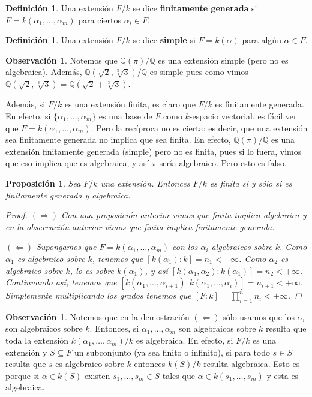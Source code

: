 \documentclass[12pt]{book}
\newtheorem{prop}[teo]{Proposición}
\theoremstyle{definition}
\newtheorem{obs}[teo]{Observación}
\newtheorem{defn}[teo]{Definición}
\newcommand{\QQ}{\mathbb{Q}}
\begin{document}
\begin{defn}
Una extensión $F/k$ se dice \textbf{finitamente generada} si $F=k(\alpha_1,\ldots , \alpha_m)$ para ciertos $\alpha_i\in F$.
\end{defn}
\begin{defn}
Una extensión $F/k$ se dice \textbf{simple} si $F=k(\alpha)$ para algún $\alpha\in F$.
\end{defn}

\begin{obs}
Notemos que $\QQ(\pi)/\QQ$ es una extensión simple (pero no es algebraica). Además, $\QQ(\sqrt{2},\sqrt[3]{3})/\QQ$ es simple pues como vimos $\QQ(\sqrt{2},\sqrt[3]{3})=\QQ(\sqrt{2}+\sqrt[3]{3})$.

Además, si $F/k$ es una extensión finita, es claro que $F/k$ es finitamente generada. En efecto, si $\{\alpha_1,\ldots , \alpha_m\}$ es una base de $F$ como $k$-espacio vectorial, es fácil ver que $F=k(\alpha_1,\ldots ,\alpha_m)$. Pero la recíproca no es cierta: es decir, que una extensión sea finitamente generada no implica que sea finita. En efecto, $\QQ(\pi)/\QQ$ es una extensión finitamente generada (simple) pero no es finita, pues si lo fuera, vimos que eso implica que es algebraica, y así $\pi$ sería algebraico. Pero esto es falso.
\end{obs}

\begin{prop}
Sea $F/k$ una extensión. Entonces $F/k$ es finita si y sólo si es finitamente generada y algebraica.
\begin{proof}

$(\Longrightarrow)$ Con una proposición anterior vimos que finita implica algebraica y en la observación anterior vimos que finita implica finitamente generada.

$(\Longleftarrow)$ Supongamos que $F=k(\alpha_1,\ldots , \alpha_m)$ con los $\alpha_i$ algebraicos sobre $k$. Como $\alpha_1$ es algebraico sobre $k$, tenemos que $[k(\alpha_1):k]=n_1<+\infty$. Como $\alpha_2$ es algebraico sobre $k$, lo es sobre $k(\alpha_1)$, y así $[k(\alpha_1,\alpha_2):k(\alpha_1)]=n_2<+\infty$. Continuando así, tenemos que $[k(\alpha_1,\ldots ,\alpha_{i+1}):k(\alpha_1,\ldots , \alpha_i)]=n_{i+1}<+\infty$. Simplemente multiplicando los grados tenemos que $[F:k]=\displaystyle\prod_{i=1}^n n_i < +\infty$.

\end{proof}
\end{prop}

\begin{obs}
Notemos que en la demostración $(\Longleftarrow)$ sólo usamos que los $\alpha_i$ son algebraicos sobre $k$. Entonces, si $\alpha_1,\ldots ,\alpha_m$ son algebraicos sobre $k$ resulta que toda la extensión $k(\alpha_1,\ldots , \alpha_m)/k$ es algebraica. En efecto, si $F/k$ es una extensión y $S\subseteq F$ un subconjunto (ya sea finito o infinito), si para todo $s\in S$ resulta que $s$ es algebraico sobre $k$ entonces $k(S)/k$ resulta algebraica. Esto es porque si $\alpha\in k(S)$ existen $s_1,\ldots , s_m\in S$ tales que $\alpha \in k(s_1,\ldots , s_m)$ y esta es algebraica.
\end{obs}
\end{document}
